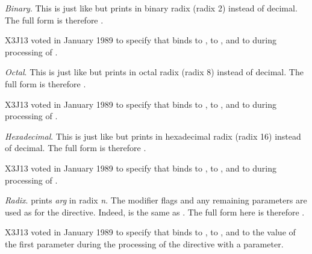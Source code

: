 \begin{flushdesc}
\item[\cd{{\Xtilde}B}]
\emph{Binary}.
This is just like  but prints in binary radix (radix 2)
instead of decimal.  The full form is therefore
.

\begin{new}
X3J13 voted in January 1989
to specify that  binds 
to ,  to , and  to 
during processing of .
\end{new}

\item[\cd{{\Xtilde}O}]
\emph{Octal}.
This is just like  but prints in octal radix (radix 8)
instead of decimal.  The full form is therefore
.

\begin{new}
X3J13 voted in January 1989
to specify that  binds 
to ,  to , and  to 
during processing of .
\end{new}

\item[\cd{{\Xtilde}X}]
\emph{Hexadecimal}.
This is just like  but prints in hexadecimal radix
(radix 16) instead of decimal.  The full form is therefore
.

\begin{new}
X3J13 voted in January 1989
to specify that  binds 
to ,  to , and  to 
during processing of .
\end{new}

\item[\cd{{\Xtilde}R}]
\emph{Radix}.
 prints \emph{arg} in radix \emph{n}.
The modifier flags and any remaining parameters are used as for
the  directive.
Indeed,  is the same as .  The full form here is therefore
.

\begin{new}
X3J13 voted in January 1989
to specify that  binds 
to ,  to , and  to the value
of the first parameter
during the processing of the  directive with a parameter.
\end{new}


\end{flushdesc}
